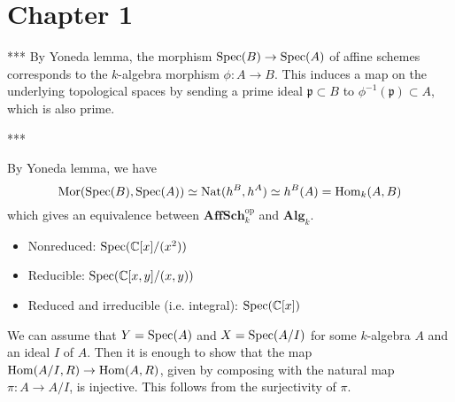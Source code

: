 \newpage
\section{Chapter 1}


\begin{problem} ***
By Yoneda lemma, the morphism $\operatorname{\mathrm{Spec}}(B) \to \operatorname{\mathrm{Spec}}(A)$ of affine schemes
corresponds to the $k$-algebra morphism $\phi: A \to B$.
This induces a map on the underlying topological spaces by sending a prime ideal
$\mathfrak{p} \subset B$ to $\phi^{-1}(\mathfrak{p}) \subset A$, which is also prime.
\end{problem}

\begin{problem} ***
\end{problem}

\begin{problem}
By Yoneda lemma, we have 
$$
\mathrm{Mor}(\operatorname{\mathrm{Spec}}(B), \operatorname{\mathrm{Spec}}(A)) \simeq \mathrm{Nat}(h^{B}, h^{A}) \simeq h^{B}(A) = \operatorname{\mathrm{Hom}}_{k}(A, B)
$$
which gives an equivalence between $\mathbf{AffSch}_{k}^{\mathrm{op}}$ and $\mathbf{Alg}_{k}$.
\end{problem}

\begin{problem}
    \begin{itemize}
        \item Nonreduced: $\operatorname{\mathrm{Spec}}(\mathbb{C}[x]/(x^{2}))$
        \item Reducible: $\operatorname{\mathrm{Spec}}(\mathbb{C}[x, y]/(x, y))$
        \item Reduced and irreducible (i.e. integral): $\operatorname{\mathrm{Spec}}(\mathbb{C}[x])$
    \end{itemize}
\end{problem}

\begin{problem} 
We can assume that $Y = \operatorname{\mathrm{Spec}}(A)$ and $X = \operatorname{\mathrm{Spec}}(A/I)$ for some $k$-algebra $A$ and an ideal $I$ of $A$.
Then it is enough to show that the map $\operatorname{\mathrm{Hom}}(A/I, R) \to \operatorname{\mathrm{Hom}}(A, R)$, given by composing with
the natural map $\pi: A \to A/I$, is injective.
This follows from the surjectivity of $\pi$.
\end{problem}

